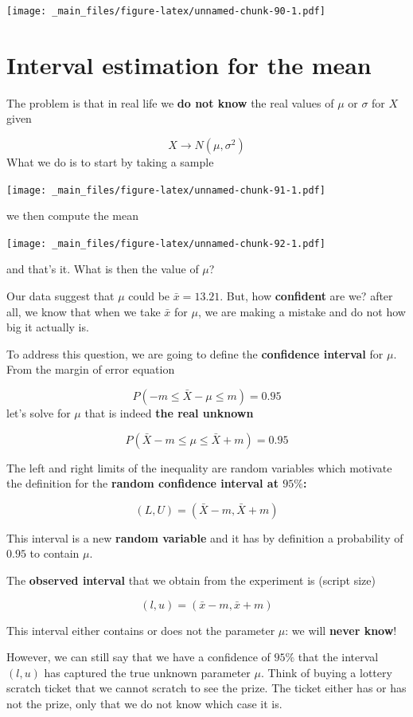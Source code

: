 \documentclass[
]{book}
\begin{document}
\texttt{[image: \_main\_files/figure-latex/unnamed-chunk-90-1.pdf]}

\hypertarget{interval-estimation-for-the-mean}{%
\section{Interval estimation for the mean}\label{interval-estimation-for-the-mean}}

The problem is that in real life we \textbf{do not know} the real values of \(\mu\) or \(\sigma\) for \(X\) given

\[X \rightarrow N(\mu, \sigma^2)\]
What we do is to start by taking a sample

\texttt{[image: \_main\_files/figure-latex/unnamed-chunk-91-1.pdf]}

we then compute the mean

\texttt{[image: \_main\_files/figure-latex/unnamed-chunk-92-1.pdf]}

and that's it. What is then the value of \(\mu\)?

Our data suggest that \(\mu\) could be \(\bar{x}=13.21\). But, how \textbf{confident} are we? after all, we know that when we take \(\bar{x}\) for \(\mu\), we are making a mistake and do not how big it actually is.

To address this question, we are going to define the \textbf{confidence interval} for \(\mu\). From the margin of error equation

\[P(-m \leq \bar{X} - \mu \leq  m)=0.95\]
let's solve for \(\mu\) that is indeed \textbf{the real unknown}

\[P(\bar{X} - m \leq \mu \leq \bar{X} + m)=0.95\]

The left and right limits of the inequality are random variables which motivate the definition for the \textbf{random confidence interval at \(95\%\):}

\[(L,U)=(\bar{X} - m,\bar{X} + m)\]

This interval is a new \textbf{random variable} and it has by definition a probability of \(0.95\) to contain \(\mu\).

The \textbf{observed interval} that we obtain from the experiment is (script size)

\[(l,u)=(\bar{x} - m,\bar{x} + m)\]

This interval either contains or does not the parameter \(\mu\): we will \textbf{never know}!

However, we can still say that we have a confidence of \(95\%\) that the interval \((l,u)\) has captured the true unknown parameter \(\mu\). Think of buying a lottery scratch ticket that we cannot scratch to see the prize. The ticket either has or has not the prize, only that we do not know which case it is.
\end{document}
